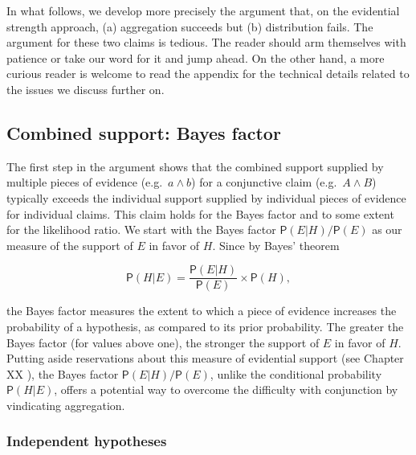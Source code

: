\documentclass[
  10pt,
  dvipsnames,enabledeprecatedfontcommands]{scrartcl}
\newcommand{\pr}[1]{\ensuremath{\mathsf{P}(#1)}}
\begin{document}
In what follows, we develop more precisely the argument that, on the
evidential strength approach, (a) aggregation succeeds but (b)
distribution fails. The argument for these two claims is tedious. The
reader should arm themselves with patience or take our word for it and
jump ahead. On the other hand, a more curious reader is welcome to read
the appendix for the technical details related to the issues we discuss
further on.

\hypertarget{combined-support-bayes-factor}{%
\subsection{Combined support: Bayes
factor}\label{combined-support-bayes-factor}}

The first step in the argument shows that the combined support supplied
by multiple pieces of evidence (e.g.~\(a\wedge b\)) for a conjunctive
claim (e.g.~\(A\wedge B\)) typically exceeds the individual support
supplied by individual pieces of evidence for individual claims. This
claim holds for the Bayes factor and to some extent for the likelihood
ratio. We start with the Bayes factor \(\pr{E \vert H}/\pr{E}\) as our
measure of the support of \(E\) in favor of \(H\). Since by Bayes'
theorem

\[\pr{H \vert E} = \frac{\pr{E \vert H}}{\pr{E}}\times \pr{H},\]

\noindent the Bayes factor measures the extent to which a piece of
evidence increases the probability of a hypothesis, as compared to its
prior probability. The greater the Bayes factor (for values above one),
the stronger the support of \(E\) in favor of \(H\). Putting aside
reservations about this measure of evidential support (see Chapter XX
), the Bayes factor
\(\pr{E \vert H}/\pr{E}\), unlike the conditional probability
\(\pr{H \vert E}\), offers a potential way to overcome the difficulty
with conjunction by vindicating aggregation.

\hypertarget{independent-hypotheses-1}{%
\subsubsection{Independent hypotheses}\label{independent-hypotheses-1}}
\end{document}
